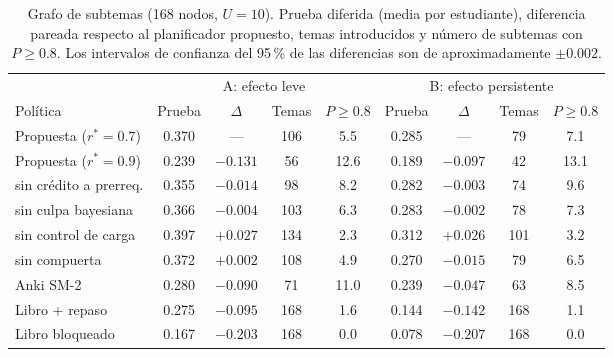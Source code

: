 \documentclass[runningheads]{llncs}
\newcommand{\rstar}{r^{\ast}}
\begin{document}
\begin{table}[t]
\centering
\caption{Grafo de subtemas (168 nodos, $U=10$). Prueba diferida (media por estudiante), diferencia pareada respecto al planificador propuesto, temas introducidos y número de subtemas con $P\ge0.8$. Los intervalos de confianza del 95\,\% de las diferencias son de aproximadamente $\pm0.002$.}
\label{tab:sub}
\setlength{\tabcolsep}{3pt}
\begin{tabular}{@{}lcccccccc@{}}
\toprule
& \multicolumn{4}{c}{A: efecto leve} & \multicolumn{4}{c}{B: efecto persistente} \\
\cmidrule(lr){2-5}\cmidrule(lr){6-9}
Política & Prueba & $\Delta$ & Temas & $P\!\ge\!0.8$ & Prueba & $\Delta$ & Temas & $P\!\ge\!0.8$ \\
\midrule
Propuesta ($\rstar=0.7$) & 0.370 & --- & 106 & 5.5 & 0.285 & --- & 79 & 7.1 \\
Propuesta ($\rstar=0.9$) & 0.239 & $-0.131$ & 56 & 12.6 & 0.189 & $-0.097$ & 42 & 13.1 \\
\quad sin crédito a prerreq. & 0.355 & $-0.014$ & 98 & 8.2 & 0.282 & $-0.003$ & 74 & 9.6 \\
\quad sin culpa bayesiana & 0.366 & $-0.004$ & 103 & 6.3 & 0.283 & $-0.002$ & 78 & 7.3 \\
\quad sin control de carga & 0.397 & $+0.027$ & 134 & 2.3 & 0.312 & $+0.026$ & 101 & 3.2 \\
\quad sin compuerta & 0.372 & $+0.002$ & 108 & 4.9 & 0.270 & $-0.015$ & 79 & 6.5 \\
Anki SM-2 & 0.280 & $-0.090$ & 71 & 11.0 & 0.239 & $-0.047$ & 63 & 8.5 \\
Libro + repaso & 0.275 & $-0.095$ & 168 & 1.6 & 0.144 & $-0.142$ & 168 & 1.1 \\
Libro bloqueado & 0.167 & $-0.203$ & 168 & 0.0 & 0.078 & $-0.207$ & 168 & 0.0 \\
\bottomrule
\end{tabular}
\end{table}
\end{document}
